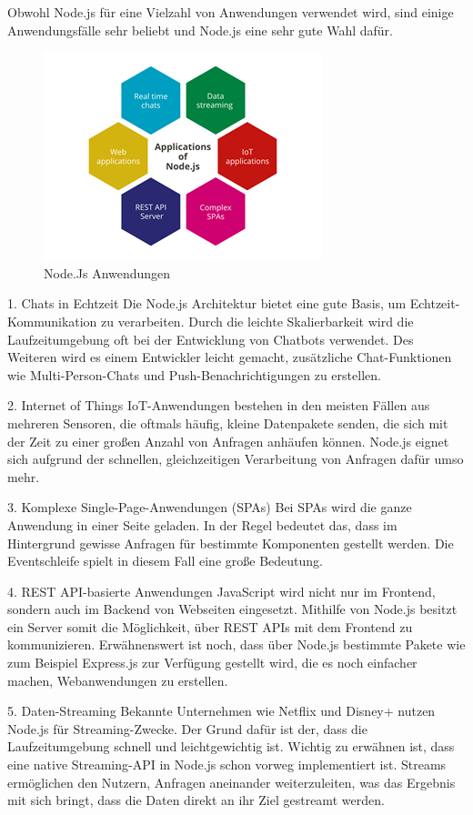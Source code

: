 Obwohl Node.js für eine Vielzahl von Anwendungen verwendet wird, sind einige Anwendungsfälle sehr beliebt und Node.js eine sehr gute Wahl dafür.
\begin{figure}[H]
    \centering
    \includegraphics{media/NodeJs/NodeJsAnwendungen.png}
    \caption{Node.Js Anwendungen}
\end{figure}

1.	Chats in Echtzeit
Die Node.js Architektur bietet eine gute Basis, um Echtzeit-Kommunikation zu verarbeiten. Durch die leichte Skalierbarkeit wird die Laufzeitumgebung oft bei der Entwicklung von Chatbots verwendet. Des Weiteren wird es einem Entwickler leicht gemacht, zusätzliche Chat-Funktionen wie Multi-Person-Chats und Push-Benachrichtigungen zu erstellen.

2.	Internet of Things
IoT-Anwendungen bestehen in den meisten Fällen aus mehreren Sensoren, die oftmals häufig, kleine Datenpakete senden, die sich mit der Zeit zu einer großen Anzahl von Anfragen anhäufen können. Node.js eignet sich aufgrund der schnellen, gleichzeitigen Verarbeitung von Anfragen dafür umso mehr.

3.	Komplexe Single-Page-Anwendungen (SPAs)
Bei SPAs wird die ganze Anwendung in einer Seite geladen. In der Regel bedeutet das, dass im Hintergrund gewisse Anfragen für bestimmte Komponenten gestellt werden. Die Eventschleife spielt in diesem Fall eine große Bedeutung.

4.	REST API-basierte Anwendungen
JavaScript wird nicht nur im Frontend, sondern auch im Backend von Webseiten eingesetzt. Mithilfe von Node.js besitzt ein Server somit die Möglichkeit, über REST APIs mit dem Frontend zu kommunizieren. Erwähnenswert ist noch, dass über Node.js bestimmte Pakete wie zum Beispiel Express.js zur Verfügung gestellt wird, die es noch einfacher machen, Webanwendungen zu erstellen.

5.	Daten-Streaming
Bekannte Unternehmen wie Netflix und Disney+ nutzen Node.js für Streaming-Zwecke. Der Grund dafür ist der, dass die Laufzeitumgebung schnell und leichtgewichtig ist. Wichtig zu erwähnen ist, dass eine native Streaming-API in Node.js schon vorweg implementiert ist. Streams ermöglichen den Nutzern, Anfragen aneinander weiterzuleiten, was das Ergebnis mit sich bringt, dass die Daten direkt an ihr Ziel gestreamt werden.

